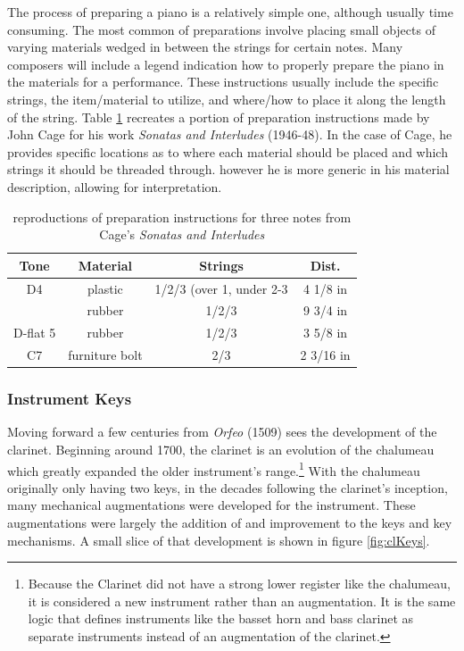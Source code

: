 The process of preparing a piano is a relatively simple one, although usually time consuming\cite{ppVideo}. The most common of preparations involve placing small objects of varying materials wedged in between the strings for certain notes. Many composers will include a legend indication how to properly prepare the piano in the materials for a performance. These instructions usually include the specific strings, the item/material to utilize, and where/how to place it along the length of the string. Table \ref{fig:siPrep} recreates a portion of preparation instructions made by John Cage for his work \textit{Sonatas and Interludes} (1946-48). In the case of Cage, he provides specific locations as to where each material should be placed and which strings it should be threaded through. however he is more generic in his material description, allowing for interpretation\cite{ppVideo}. 

\begin{table}[]
    \centering
    \begin{tabular}{|c||c|c|c|}
    \hline
        Tone   & Material & Strings & Dist. \\
        \hline
         D4 & plastic & 1/2/3 (over 1, under 2-3 & 4 1/8 in \\
                  & rubber & 1/2/3 & 9 3/4 in \\
                  \hline
         D-flat 5 & rubber & 1/2/3 & 3 5/8 in \\   
         \hline
         C7 & furniture bolt & 2/3 & 2 3/16 in \\
         \hline
    \end{tabular}
    \caption{ reproductions of preparation instructions for three notes from Cage's \textit{Sonatas and Interludes}}
    \label{fig:siPrep}
\end{table}

\subsubsection{Instrument Keys}

Moving forward a few centuries from \textit{Orfeo} (1509) sees the development of the clarinet. Beginning around 1700, the clarinet is an evolution of the chalumeau which greatly expanded the older instrument's range.\footnote{Because the Clarinet did not have a strong lower register like the chalumeau, it is considered a new instrument rather than an augmentation. It is the same logic that defines instruments like the basset horn and bass clarinet as separate instruments instead of an augmentation of the clarinet.} With the chalumeau originally only having two keys, in the decades following the clarinet's inception, many mechanical augmentations were developed for the instrument. These augmentations were largely the addition of and improvement to the keys and key mechanisms. A small slice of that development is shown in figure \ref{fig:clKeys}. 

